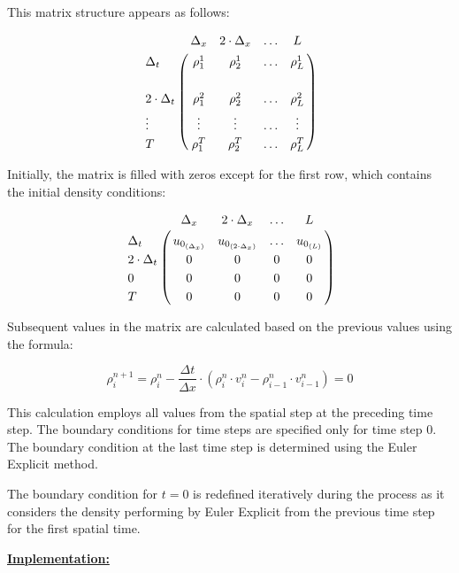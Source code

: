 \documentclass{article}
\begin{document}
		This matrix structure appears as follows:
		
		\begin{align*}
			\bordermatrix { 
				& \Delta_x & 2\cdot \Delta_x & \hdots & L \cr 
				\Delta_t & \rho_1^1 & \rho_2^1 & \hdots & \rho_L^1 \cr \cr
				2\cdot \Delta_t & \rho_1^2 & \rho_2^2 & \hdots & \rho_L^2\cr
				\vdots & \vdots & \vdots & \hdots & \vdots \cr
				T & \rho_1^T & \rho_2^T & \hdots & \rho_L^T}
		\end{align*}
		

		Initially, the matrix is filled with zeros except for the first row, which contains the initial density conditions:

		\begin{align*}
			\bordermatrix { 
				& \Delta_x & 2\cdot \Delta_x & \hdots & L \cr 
				\Delta_t & u_{0_{(\Delta_x)}} & u_{0_{(2 \cdot \Delta_x)}} & \hdots & u_{0_{(L)}} \cr 
				2\cdot \Delta_t & 0 & 0 & 0 & 0\cr
				0 & 0 & 0 & 0 & 0 \cr
				T & 0 & 0 & 0 & 0}
		\end{align*}

		 
	
		Subsequent values in the matrix are calculated based on the previous values using the formula:
		
		\[
		\rho_{i}^{n+1} = \rho_i^n - \frac{\Delta t}{\Delta x} \cdot \left(\rho_i^n \cdot v_i^n - \rho_{i-1}^n \cdot v_{i-1}^n \right) = 0
		\]
		
		This calculation employs all values from the spatial step at the preceding time step. The boundary conditions for time steps are specified only for time step 0. The boundary condition at the last time step is determined using the Euler Explicit method.
		
		The boundary condition for \(t=0\) is redefined iteratively during the process as it considers the density performing by Euler Explicit from the previous time step for the first spatial time.

	
		
		\textbf{\underline{Implementation:}} \newline\newline
		
\end{document}
